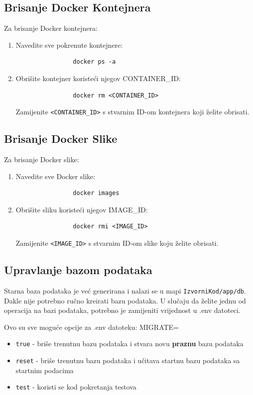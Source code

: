 		\subsection*{Brisanje Docker Kontejnera}
		Za brisanje Docker kontejnera:
		\begin{enumerate}
			\item Navedite sve pokrenute kontejnere:
			\begin{verbatim}
				docker ps -a
			\end{verbatim}
			\item Obrišite kontejner koristeći njegov CONTAINER\_ID:
			\begin{verbatim}
				docker rm <CONTAINER_ID>
			\end{verbatim}
			Zamijenite \texttt{<CONTAINER\_ID>} s stvarnim ID-om kontejnera koji želite obrisati.
		\end{enumerate}

		\subsection*{Brisanje Docker Slike}
		Za brisanje Docker slike:
		\begin{enumerate}
			\item Navedite sve Docker slike:
			\begin{verbatim}
				docker images
			\end{verbatim}
			\item Obrišite sliku koristeći njegov IMAGE\_ID:
			\begin{verbatim}
				docker rmi <IMAGE_ID>
			\end{verbatim}
			Zamijenite \texttt{<IMAGE\_ID>} s stvarnim ID-om slike koju želite obrisati.
		\end{enumerate}

		\subsection*{Upravlanje bazom podataka}
			Starna baza podataka je već generirana i nalazi se u mapi \texttt{IzvorniKod/app/db}.
			Dakle nije potrebno ručno kreirati bazu podataka.
			U slučaju da želite jednu od operacija na bazi podataka, potrebno je zamijeniti vrijednost u .env datoteci.

			Ovo su sve moguće opcije za .env datoteku:
			MIGRATE=
			\begin{itemize}
				\item \texttt{true} - briše trenutnu bazu podataka i stvara novu \textbf{praznu} bazu podataka
				\item \texttt{reset} - briše trenutnu bazu podataka i učitava startnu bazu podataka sa startnim podacima
				\item \texttt{test} - koristi se kod pokretanja testova 
			\end{itemize}
	
